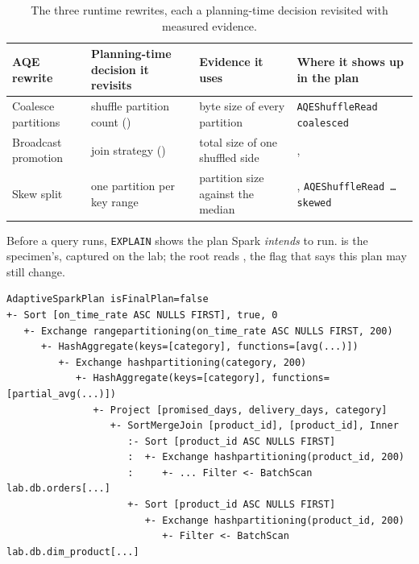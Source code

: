 \begin{table}[htbp]
\centering\footnotesize
\renewcommand{\arraystretch}{1.25}
\begin{tabular}{@{}P{2.7cm}P{3.5cm}P{3.5cm}P{4.0cm}@{}}
\toprule
\textbf{AQE rewrite} & \textbf{Planning-time decision it revisits} & \textbf{Evidence it uses} & \textbf{Where it shows up in the plan} \\
\midrule
Coalesce partitions & shuffle partition count () & byte size of every partition & \texttt{AQEShuffleRead coalesced} \\
Broadcast promotion & join strategy () & total size of one shuffled side & ,  \\
Skew split & one partition per key range & partition size against the median & , \texttt{AQEShuffleRead \ldots{} skewed} \\
\bottomrule
\end{tabular}
\caption{The three runtime rewrites, each a planning-time decision revisited
with measured evidence.}
\label{tab:aqe-rewrites}
\end{table}

Before a query runs, \texttt{EXPLAIN} shows the plan Spark \emph{intends} to run.
 is the specimen's, captured on the lab; the root
reads , the flag that says this plan may still change.

\begin{lstlisting}[language=text,numbers=none,style=plan,caption={The specimen's plan before it runs (\texttt{EXPLAIN}, trimmed)},captionpos=b,label=lst:aqe-explain-before]
AdaptiveSparkPlan isFinalPlan=false
+- Sort [on_time_rate ASC NULLS FIRST], true, 0
   +- Exchange rangepartitioning(on_time_rate ASC NULLS FIRST, 200)
      +- HashAggregate(keys=[category], functions=[avg(...)])
         +- Exchange hashpartitioning(category, 200)
            +- HashAggregate(keys=[category], functions=[partial_avg(...)])
               +- Project [promised_days, delivery_days, category]
                  +- SortMergeJoin [product_id], [product_id], Inner
                     :- Sort [product_id ASC NULLS FIRST]
                     :  +- Exchange hashpartitioning(product_id, 200)
                     :     +- ... Filter <- BatchScan lab.db.orders[...]
                     +- Sort [product_id ASC NULLS FIRST]
                        +- Exchange hashpartitioning(product_id, 200)
                           +- Filter <- BatchScan lab.db.dim_product[...]
\end{lstlisting}

